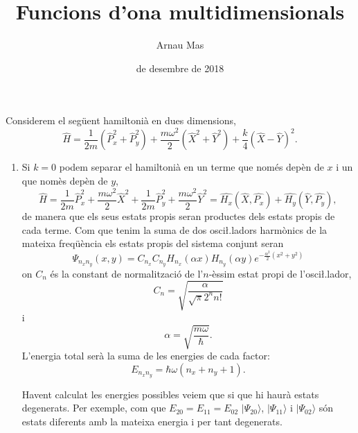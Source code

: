 \documentclass[12pt]{article}
\title{\sffamily {\bfseries Entrega 5:} Funcions d'ona multidimensionals}
\author{\sffamily Arnau Mas}
\date{\sffamily 20 de desembre de 2018}
\numberwithin{table}{section}
\numberwithin{figure}{section}
\numberwithin{equation}{section}
\newcommand{\ket}[1]{\vert #1 \rangle}
\begin{document}
\maketitle
Considerem el següent hamiltonià en dues dimensions,
\begin{equation*}
	\hat{H} = \frac{1}{2m}\left(\hat{P}_x^2 + \hat{P}_y^2\right) + \frac{m\omega^2}{2}\left(\hat{X}^2 + \hat{Y}^2\right) + \frac{k}{4}\left(\hat{X} - \hat{Y}\right)^2. 
\end{equation*}

\begin{enumerate}[label=(\alph*), font=\bfseries \sffamily, wide, labelwidth=!, labelindent=0pt]
	\item Si \( k = 0 \) podem separar el hamiltonià en un terme que només depèn de \( x \) i un que nomès depèn de \( y \),
		\begin{equation*}
			\hat{H} = \frac{1}{2m}\hat{P}_x^2 + \frac{m\omega^2}{2}\hat{X}^2 + \frac{1}{2m}\hat{P}_y^2 + \frac{m\omega^2}{2}\hat{Y}^2 = \hat{H_x}(\hat{X},\hat{P_x}) + \hat{H_y}(\hat{Y}, \hat{P_y}),
		\end{equation*}
		de manera que els seus estats propis seran productes dels estats propis de cada terme. Com que tenim la suma de dos osci\l.ladors harmònics de la mateixa freqüència els estats propis del sistema conjunt seran
		\begin{equation*}
			\Psi_{n_x n_y}(x,y) = C_{n_x}C_{n_y} H_{n_x}(\alpha x) H_{n_y}(\alpha y) e^{-\frac{\alpha^2}{2}\left(x^2 + y^2\right)} 
		\end{equation*}
		on \( C_n \) és la constant de normalització de l'\( n \)-èssim estat propi de l'osci\l.lador, 
		\begin{equation*}
			C_n = \sqrt{\frac{\alpha}{\sqrt{\pi}2^n n!}}
		\end{equation*}
		i
		\begin{equation*}
			\alpha = \sqrt{\frac{m\omega}{\hbar}}. 
		\end{equation*}
		L'energia total serà la suma de les energies de cada factor:
		\begin{equation*}
			E_{n_x n_y} = \hbar \omega(n_x + n_y + 1).
		\end{equation*}

		Havent calculat les energies possibles veiem que si que hi haurà estats degenerats. Per exemple, com que \( E_{20} = E_{11} = E_{02} \) \( \ket{\Psi_{20}} \), \( \ket{\Psi_{11}} \) i \( \ket{\Psi_{02}} \) són estats diferents amb la mateixa energia i per tant degenerats. 


\end{enumerate}
\end{document}
